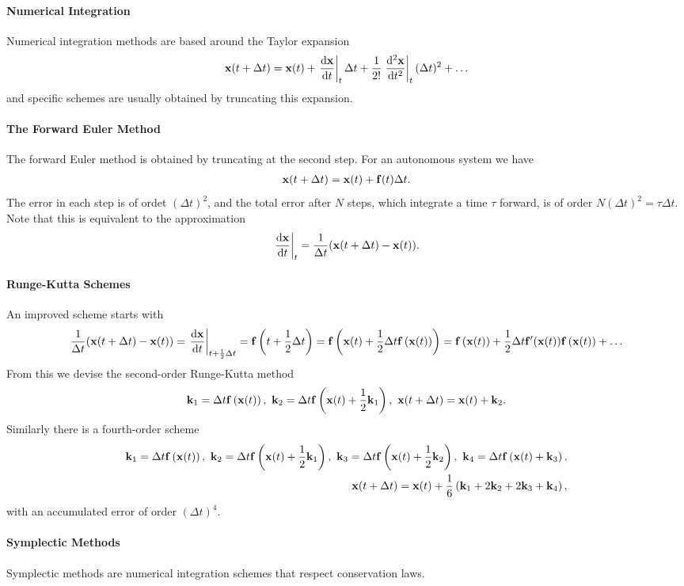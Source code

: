 \paragraph{Numerical Integration}
Numerical integration methods are based around the Taylor expansion
\begin{align*}
	\vb{x}(t + \Delta t) = \vb{x}(t) + \eval{\dv{\vb{x}}{t}}_{t}\Delta t + \frac{1}{2!}\eval{\dv[2]{\vb{x}}{t}}_{t}(\Delta t)^{2} + \dots
\end{align*}
and specific schemes are usually obtained by truncating this expansion.

\paragraph{The Forward Euler Method}
The forward Euler method is obtained by truncating at the second step. For an autonomous system we have
\begin{align*}
	\vb{x}(t + \Delta t) = \vb{x}(t) + \vb{f}(t)\Delta t.
\end{align*}
The error in each step is of ordet $(\Delta t)^{2}$, and the total error after $N$ steps, which integrate a time $\tau$ forward, is of order $N(\Delta t)^{2} = \tau\Delta t$. Note that this is equivalent to the approximation
\begin{align*}
	\eval{\dv{\vb{x}}{t}}_{t} = \frac{1}{\Delta t}(\vb{x}(t + \Delta t) - \vb{x}(t)).
\end{align*}

\paragraph{Runge-Kutta Schemes}
An improved scheme starts with
\begin{align*}
	\frac{1}{\Delta t}(\vb{x}(t + \Delta t) - \vb{x}(t)) = \eval{\dv{\vb{x}}{t}}_{t + \frac{1}{2}\Delta t} = \vb{f}\left(t + \frac{1}{2}\Delta t\right) = \vb{f}\left(\vb{x}(t) + \frac{1}{2}\Delta t\vb{f}\left(\vb{x}(t)\right)\right) = \vb{f}\left(\vb{x}(t)\right) + \frac{1}{2}\Delta t\vb{f}\p(\vb{x}(t))\vb{f}\left(\vb{x}(t)\right) + \dots
\end{align*}
From this we devise the second-order Runge-Kutta method
\begin{align*}
	\vb{k}_{1} = \Delta t\vb{f}\left(\vb{x}(t)\right),\ \vb{k}_{2} = \Delta t\vb{f}\left(\vb{x}(t) + \frac{1}{2}\vb{k}_{1}\right),\ \vb{x}(t + \Delta t) = \vb{x}(t) + \vb{k}_{2}.
\end{align*}
Similarly there is a fourth-order scheme
\begin{align*}
	\vb{k}_{1} = \Delta t\vb{f}\left(\vb{x}(t)\right),\ \vb{k}_{2} = \Delta t\vb{f}\left(\vb{x}(t) + \frac{1}{2}\vb{k}_{1}\right),\ \vb{k}_{3} = \Delta t\vb{f}\left(\vb{x}(t) + \frac{1}{2}\vb{k}_{2}\right),\ \vb{k}_{4} = \Delta t\vb{f}\left(\vb{x}(t) + \vb{k}_{3}\right), \\
	\vb{x}(t + \Delta t) = \vb{x}(t) + \frac{1}{6}\left(\vb{k}_{1} + 2\vb{k}_{2} + 2\vb{k}_{3} + \vb{k}_{4}\right),
\end{align*}
with an accumulated error of order $(\Delta t)^{4}$.

\paragraph{Symplectic Methods}
Symplectic methods are numerical integration schemes that respect conservation laws.